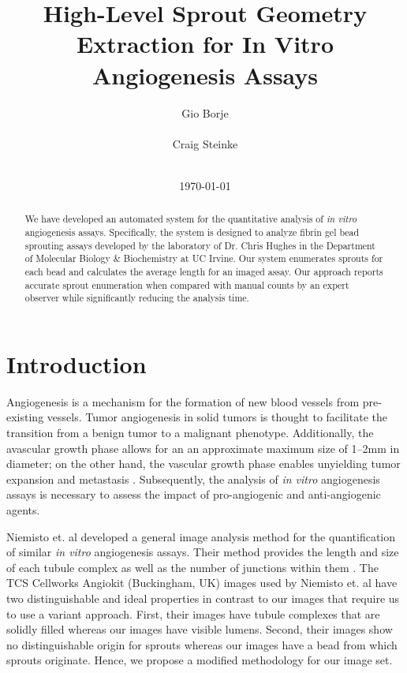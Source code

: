 \documentclass{sig-alternate}
\newcommand{\invitro}{\emph{in vitro} }
\begin{document}
\title{High-Level Sprout Geometry Extraction for In Vitro Angiogenesis Assays}
\author{
	\alignauthor Gio Borje \\
		 \\
	\alignauthor Craig Steinke \\
		 \\
}
\date{\today}
\maketitle

\begin{abstract}
	We have developed an automated system for the quantitative analysis of
	\invitro angiogenesis assays. Specifically, the system is designed to
	analyze fibrin gel bead sprouting assays developed by the laboratory
	of Dr. Chris Hughes in the Department of Molecular Biology \&
	Biochemistry at UC Irvine. Our system enumerates sprouts for each
	bead and calculates the average length for an imaged assay. Our
	approach reports accurate sprout enumeration when compared with manual
	counts by an expert observer while significantly reducing the analysis
	time.
\end{abstract}

\section{Introduction} %
\label{sec:Introduction}
	Angiogenesis is a mechanism for the formation of new blood vessels
	from pre-existing vessels. Tumor angiogenesis in solid tumors is
	thought to facilitate the transition from a benign tumor to a
	malignant phenotype. Additionally, the avascular growth phase allows
	for an an approximate maximum size of 1--2mm in diameter; on the other
	hand, the vascular growth phase enables unyielding tumor expansion
	and metastasis \cite{kerbel99}. Subsequently, the analysis of
	\invitro angiogenesis assays is necessary to assess the impact of
	pro-angiogenic and anti-angiogenic agents.

	Niemisto et. al developed a general image analysis method for the
	quantification of similar \invitro angiogenesis assays. Their method
	provides the length and size of each tubule complex as well as the number
	of junctions within them \cite{niemisto05}. The TCS Cellworks Angiokit
	(Buckingham, UK) images used by Niemisto et. al have two distinguishable
	and ideal properties in contrast to our images that require us to use a
	variant approach. First, their images have tubule complexes that are
	solidly filled whereas our images have visible lumens. Second, their images
	show no distinguishable origin for sprouts whereas our images have a bead
	from which sprouts originate. Hence, we propose a modified methodology for
	our image set.
\end{document}
